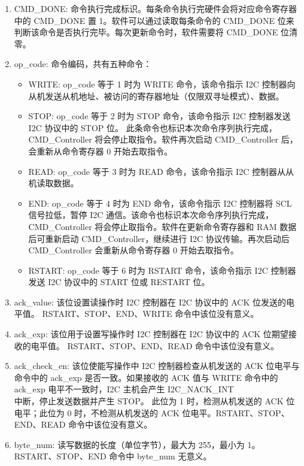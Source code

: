 \documentclass[main\_\_CN.tex]{subfiles}
\begin{document}
\begin{enumerate}

\item CMD\_DONE: 命令执行完成标识。每条命令执行完硬件会将对应命令寄存器中的 CMD\_DONE 置 1。软件可以通过读取每条命令的 CMD\_DONE 位来判断该命令是否执行完毕。每次更新命令时，软件需要将 CMD\_DONE 位清零。

\item op\_code: 命令编码，共有五种命令：

\begin{itemize}

    \item WRITE: op\_code 等于 1 时为 WRITE 命令，该命令指示 I2C 控制器向从机发送从机地址、被访问的寄存器地址（仅限双寻址模式）、数据。

    \item STOP: op\_code 等于 2 时为 STOP 命令，该命令指示 I2C 控制器发送 I2C 协议中的 STOP 位。 此条命令也标识本次命令序列执行完成，CMD\_Controller 将会停止取指令。软件再次启动 CMD\_Controller 后，会重新从命令寄存器 0 开始去取指令。

    \item READ: op\_code 等于 3 时为 READ 命令，该命令指示 I2C 控制器从从机读取数据。

    \item END: op\_code 等于 4 时为 END 命令，该命令指示 I2C 控制器将 SCL 信号拉低，暂停 I2C 通信。该命令也标识本次命令序列执行完成，CMD\_Controller 将会停止取指令。软件在更新命令寄存器和 RAM 数据后可重新启动 CMD\_Controller，继续进行 I2C 协议传输。再次启动后 CMD\_Controller 会重新从命令寄存器 0 开始去取指令。

    \item RSTART: op\_code 等于 6 时为 RSTART 命令，该命令指示 I2C 控制器发送 I2C 协议中的 START 位或 RESTART 位。

\end{itemize}

\item ack\_value: 该位设置读操作时 I2C 控制器在 I2C 协议中的 ACK 位发送的电平值。 RSTART、STOP、END、WRITE 命令中该位没有意义。

\item ack\_exp: 该位用于设置写操作时 I2C 控制器在 I2C 协议中的 ACK 位期望接收的电平值。 RSTART、STOP、END、READ 命令中该位没有意义。

\item ack\_check\_en: 该位使能写操作中 I2C 控制器检查从机发送的 ACK 位电平与命令中的 ack\_exp 是否一致。如果接收的 ACK 值与 WRITE 命令中的 ack\_exp 电平不一致时，I2C 主机会产生 I2C\_NACK\_INT\\ 中断，停止发送数据并产生 STOP。 此位为 1 时，检测从机发送的 ACK 位电平；此位为 0 时，不检测从机发送的 ACK 位电平。RSTART、STOP、END、READ 命令中该位没有意义。

\item byte\_num: 读写数据的长度（单位字节），最大为 255，最小为 1。RSTART、STOP、END 命令中 byte\_num 无意义。

\end{enumerate}
\end{document}
